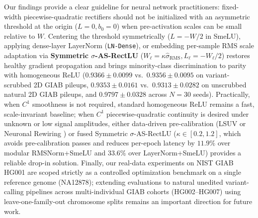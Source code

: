 \documentclass[11pt, a4paper]{article}
\begin{document}
Our findings provide a clear guideline for neural network practitioners: fixed-width piecewise-quadratic rectifiers should not be initialized with an asymmetric threshold at the origin ($L = 0, b_{0} = 0$) when pre-activation scales can be small relative to $W$. Centering the threshold symmetrically ($L = -W/2$ in SmeLU), applying dense-layer LayerNorm (\texttt{LN-Dense}), or embedding per-sample RMS scale adaptation via \textbf{Symmetric $\sigma$-AS-RectLU} ($W_{\ell} = \kappa\hat{\sigma}_{\text{RMS}}, L_{\ell} = -W_{\ell}/2$) restores healthy gradient propagation and brings minority-class discrimination to parity with homogeneous ReLU ($0.9366 \pm 0.0099$ vs.\ $0.9356 \pm 0.0095$ on variant-scrubbed 2D GIAB pileups, $0.9353 \pm 0.0161$ vs.\ $0.9313 \pm 0.0282$ on unscrubbed natural 2D GIAB pileups, and $0.9797 \pm 0.0328$ across $N = 30$ seeds). Practically, when $C^1$ smoothness is not required, standard homogeneous ReLU remains a fast, scale-invariant baseline; when $C^1$ piecewise-quadratic continuity is desired under unknown or low signal amplitudes, either data-driven pre-calibration (LSUV \cite{ref32} or Neuronal Rewiring \cite{ref40}) or fused Symmetric $\sigma$-AS-RectLU ($\kappa \in [0.2, 1.2]$, which avoids pre-calibration passes and reduces per-epoch latency by $11.9\%$ over modular RMSNorm+SmeLU and $33.6\%$ over LayerNorm+SmeLU) provides a reliable drop-in solution. Finally, our real-data experiments on NIST GIAB HG001 are scoped strictly as a controlled optimization benchmark on a single reference genome (NA12878); extending evaluations to natural unedited variant-calling pipelines across multi-individual GIAB cohorts (HG002--HG007) using leave-one-family-out chromosome splits remains an important direction for future work.
\end{document}
